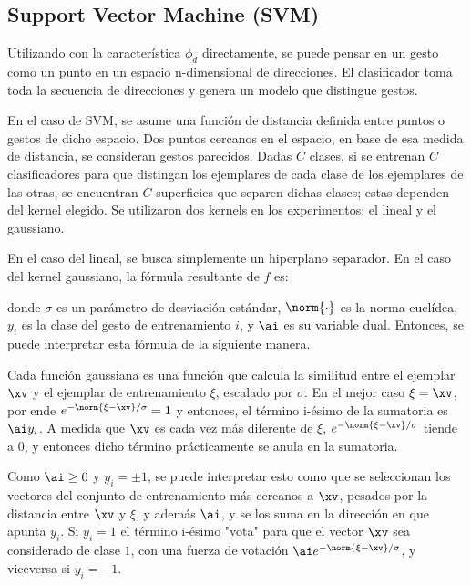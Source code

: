

\subsection{Support Vector Machine (SVM)}

Utilizando con la característica $\phi_d$ directamente, se puede pensar en un gesto como un punto en un espacio n-dimensional de direcciones. El clasificador toma toda la secuencia de direcciones y genera un modelo que distingue gestos.

En el caso de SVM, se asume una función de distancia definida entre puntos o gestos de dicho espacio. Dos puntos cercanos en el espacio, en base de esa medida de distancia, se consideran gestos parecidos. Dadas $C$ clases, si se entrenan $C$ clasificadores para que distingan los ejemplares de cada clase de los ejemplares de las otras, se encuentran $C$ superficies que separen dichas clases; estas dependen del kernel elegido. Se utilizaron dos kernels en los experimentos: el lineal y el gaussiano. 

En el caso del lineal, se busca simplemente un hiperplano separador. En el caso del kernel gaussiano,  la fórmula resultante de $f$ es:


donde $\sigma$ es un parámetro de desviación estándar, $\norm{\cdot}$ es la norma euclídea, $y_i$ es la clase del gesto de entrenamiento $i$, y $\ai$ es su variable dual. Entonces, se puede interpretar esta fórmula de la siguiente manera. 

Cada función gaussiana es una función que calcula la similitud entre el ejemplar $\xv$ y el ejemplar de entrenamiento $\xi$, escalado por $\sigma$. En el mejor caso $\xi=\xv$, por ende $e^{-\norm{\xi-\xv}/\sigma}=1$ y entonces, el término i-ésimo de la sumatoria es $\ai y_i$. A medida que $\xv$ es cada vez más diferente de $\xi$, $e^{-\norm{\xi-\xv}/\sigma}$ tiende a 0, y entonces dicho término prácticamente se anula en la sumatoria.  

Como $\ai\geq 0 $ y $y_i= \pm 1$, se puede interpretar esto como que se seleccionan los vectores del conjunto de entrenamiento más cercanos a $\xv$, pesados por la distancia entre $\xv$ y $\xi$, y además $\ai$, y se los suma en la dirección en que apunta $y_i$. Si $y_i=1$ el término i-ésimo "vota" para que el vector $\xv$ sea considerado de clase $1$, con una fuerza de votación $\ai  e^{-\norm{\xi-\xv}/\sigma}$, y viceversa si $y_i=-1$. 

